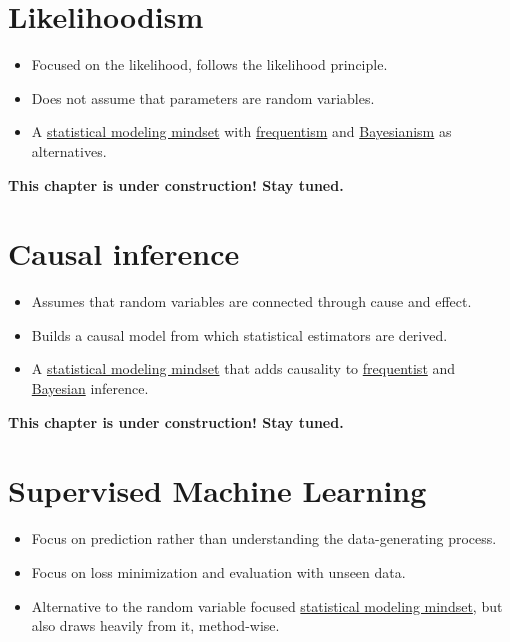 \documentclass[
  10pt,
]{scrbook}
\providecommand{\tightlist}{%
  \setlength{\itemsep}{0pt}\setlength{\parskip}{0pt}}
\begin{document}
\hypertarget{likelihoodism}{%
\chapter{Likelihoodism}\label{likelihoodism}}

\begin{itemize}
\tightlist
\item
  Focused on the likelihood, follows the likelihood principle.
\item
  Does not assume that parameters are random variables.\\
\item
  A \protect\hyperlink{statistical-modeling}{statistical modeling mindset} with \protect\hyperlink{frequent-inference}{frequentism} and \protect\hyperlink{bayesian-inference}{Bayesianism} as alternatives.
\end{itemize}

\textbf{This chapter is under construction! Stay tuned.}

\hypertarget{causal-inference}{%
\chapter{Causal inference}\label{causal-inference}}

\begin{itemize}
\tightlist
\item
  Assumes that random variables are connected through cause and effect.
\item
  Builds a causal model from which statistical estimators are derived.
\item
  A \protect\hyperlink{statistical-modeling}{statistical modeling mindset} that adds causality to \protect\hyperlink{frequentist-inference}{frequentist} and \protect\hyperlink{bayesian-inference}{Bayesian} inference.
\end{itemize}

\textbf{This chapter is under construction! Stay tuned.}

\hypertarget{supervised-ml}{%
\chapter{Supervised Machine Learning}\label{supervised-ml}}

\begin{itemize}
\tightlist
\item
  Focus on prediction rather than understanding the data-generating process.
\item
  Focus on loss minimization and evaluation with unseen data.
\item
  Alternative to the random variable focused \protect\hyperlink{statistical-modeling}{statistical modeling mindset}, but also draws heavily from it, method-wise.
\end{itemize}
\end{document}
